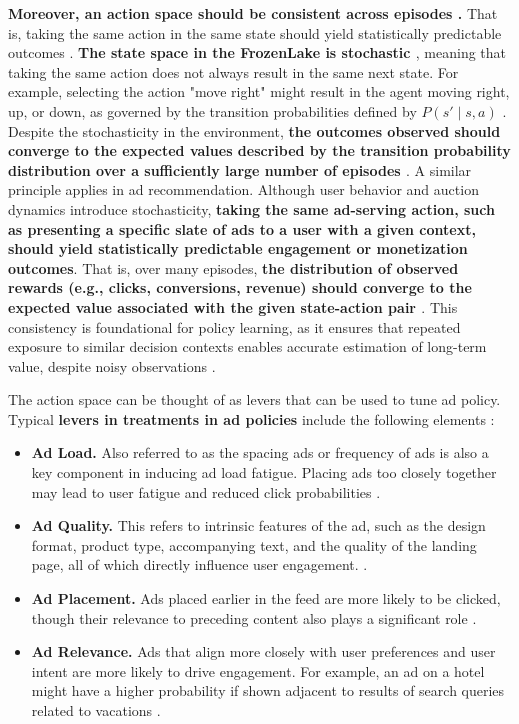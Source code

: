 \documentclass[final]{anthology-ch}         %
\begin{document}
\textbf{Moreover, an action space should be consistent across episodes \cite{puterman2014markov}.} That is, taking the same action in the same state should yield statistically predictable outcomes \cite{puterman2014markov}. \textbf{The state space in the FrozenLake is stochastic \cite{frozenlake}}, meaning that taking the same action does not always result in the same next state. For example, selecting the action "move right" might result in the agent moving right, up, or down, as governed by the transition probabilities defined by $P(s' \mid s, a)$ \cite{frozenlake}. Despite the stochasticity in the environment,\textbf{ the outcomes observed should converge to the expected values described by the transition probability distribution over a sufficiently large number of episodes \cite{puterman2014markov}}. A similar principle applies in ad recommendation. Although user behavior and auction dynamics introduce stochasticity, \textbf{taking the same ad-serving action, such as presenting a specific slate of ads to a user with a given context, should yield statistically predictable engagement or monetization outcomes}. That is, over many episodes, \textbf{the distribution of observed rewards (e.g., clicks, conversions, revenue) should converge to the expected value associated with the given state-action pair \cite{mcmahan2013ad, zhao2018deep}}. This consistency is foundational for policy learning, as it ensures that repeated exposure to similar decision contexts enables accurate estimation of long-term value, despite noisy observations \cite{Sutton1998}. 

The action space can be thought of as levers that can be used to tune ad policy. Typical \textbf{levers in treatments in ad policies} include the following elements \cite{koutsopoulos2016native}: 

\begin{itemize}
    \item \textbf{Ad Load.} Also referred to as the spacing ads or frequency of ads is also a key component in inducing ad load fatigue. Placing ads too closely together may lead to user fatigue and reduced click probabilities \cite{abrams2007personalized, zhao2020jointly}. 
    \item \textbf{Ad Quality.} This refers to intrinsic features of the ad, such as the design format, product type, accompanying text, and the quality of the landing page, all of which directly influence user engagement. \cite{yan2009much, nielsen2017advertising}.
    \item \textbf{Ad Placement.}
Ads placed earlier in the feed are more likely to be clicked, though their relevance to preceding content also plays a significant role \cite{zhao2020jointly, saha2021advertiming, yuan2020unbiased}. 
    \item \textbf{Ad Relevance.} Ads that align more closely with user preferences and user intent are more likely to drive engagement. For example, an ad on a hotel might have a higher probability if shown adjacent to results of search queries related to vacations \cite{chakrabarti2008contextual, Zhou2018}. \\
\end{itemize}
\end{document}
